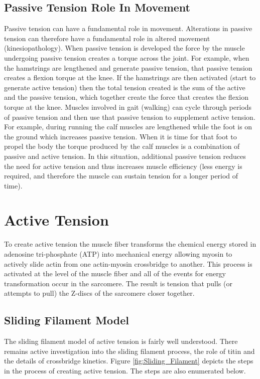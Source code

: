 \subsection{Passive Tension Role In Movement}
Passive tension can have a fundamental role in movement. Alterations in passive tension can therefore have a fundamental role in altered movement (kinesiopathology). When passive tension is developed the force by the muscle undergoing passive tension creates a torque across the joint. For example, when the hamstrings are lengthened and generate passive tension, that passive tension creates a flexion torque at the knee. If the hamstrings are then activated (start to generate active tension) then the total tension created is the sum of the active and the passive tension, which together create the force that creates the flexion torque at the knee. Muscles involved in gait (walking) can cycle through periods of passive tension and then use that passive tension to supplement active tension. For example, during running the calf muscles are lengthened while the foot is on the ground which increases passive tension. When it is time for that foot to propel the body the torque produced by the calf muscles is a combination of passive and active tension. In this situation, additional passive tension reduces the need for active tension and thus increases muscle efficiency (less energy is required, and therefore the muscle can sustain tension for a longer period of time).

\section{Active Tension}

To create active tension the muscle fiber transforms the chemical energy stored in adenosine tri-phosphate (ATP) into mechanical energy allowing myosin to actively slide actin from one actin-myosin crossbridge to another. This process is activated at the level of the muscle fiber and all of the events for energy transformation occur in the sarcomere. The result is tension that pulls (or attempts to pull) the Z-discs of the sarcomere closer together.

\subsection{Sliding Filament Model}
The sliding filament model of active tension is fairly well understood. There remains active investigation into the sliding filament process, the role of titin and the details of crossbridge kinetics.
\vspace{0.2cm}
Figure \ref{fig:Sliding_Filament} depicts the steps in the process of creating active tension. The steps are also enumerated below.

